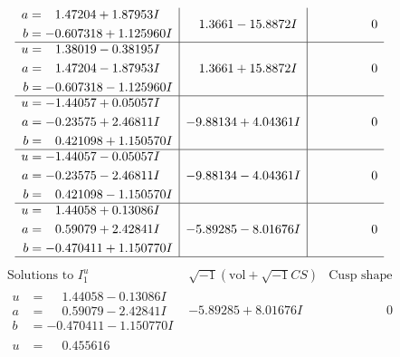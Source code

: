 \documentclass[1p]{elsarticle_modified}
\theoremstyle{definition}
\newcommand{\I}{\sqrt{-1}}
\begin{document}
$$\begin{array}{c|c|c}
\begin{aligned}
a &= \phantom{-}1.47204 + 1.87953 I \\
b &= -0.607318 + 1.125960 I\end{aligned}
 & \phantom{-}1.3661 - 15.8872 I & \phantom{-0.000000 } 0 \\ \hline\begin{aligned}
u &= \phantom{-}1.38019 - 0.38195 I \\
a &= \phantom{-}1.47204 - 1.87953 I \\
b &= -0.607318 - 1.125960 I\end{aligned}
 & \phantom{-}1.3661 + 15.8872 I & \phantom{-0.000000 } 0 \\ \hline\begin{aligned}
u &= -1.44057 + 0.05057 I \\
a &= -0.23575 + 2.46811 I \\
b &= \phantom{-}0.421098 + 1.150570 I\end{aligned}
 & -9.88134 + 4.04361 I & \phantom{-0.000000 } 0 \\ \hline\begin{aligned}
u &= -1.44057 - 0.05057 I \\
a &= -0.23575 - 2.46811 I \\
b &= \phantom{-}0.421098 - 1.150570 I\end{aligned}
 & -9.88134 - 4.04361 I & \phantom{-0.000000 } 0 \\ \hline\begin{aligned}
u &= \phantom{-}1.44058 + 0.13086 I \\
a &= \phantom{-}0.59079 + 2.42841 I \\
b &= -0.470411 + 1.150770 I\end{aligned}
 & -5.89285 - 8.01676 I & \phantom{-0.000000 } 0\\
 \hline 
 \end{array}$$\newpage$$\begin{array}{c|c|c}  
\text{Solutions to }I^u_{1}& \I (\text{vol} + \sqrt{-1}CS) & \text{Cusp shape}\\
 \hline 
\begin{aligned}
u &= \phantom{-}1.44058 - 0.13086 I \\
a &= \phantom{-}0.59079 - 2.42841 I \\
b &= -0.470411 - 1.150770 I\end{aligned}
 & -5.89285 + 8.01676 I & \phantom{-0.000000 } 0 \\ \hline\begin{aligned}
u &= \phantom{-}0.455616\phantom{ +0.000000I} \\

\end{aligned}
\end{array}$$
\end{document}
